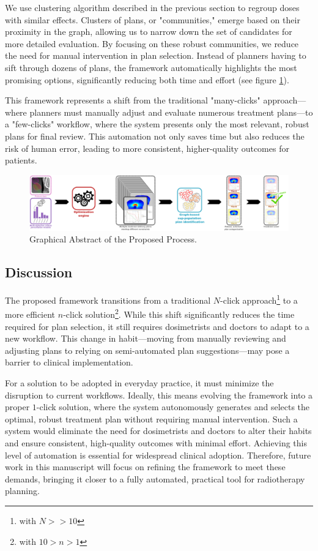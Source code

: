 We use clustering algorithm described in the previous section to regroup doses with similar effects.
Clusters of plans, or "communities," emerge based on their proximity in the graph, allowing us to narrow down the set of candidates for more detailed evaluation.
By focusing on these robust communities, we reduce the need for manual intervention in plan selection.
Instead of planners having to sift through dozens of plans, the framework automatically highlights the most promising options, significantly reducing both time and effort (see figure \ref{fig:graphical_abstract}).

This framework represents a shift from the traditional "many-clicks" approach—where planners must manually adjust and evaluate numerous treatment plans—to a "few-clicks" workflow, where the system presents only the most relevant, robust plans for final review.
This automation not only saves time but also reduces the risk of human error, leading to more consistent, higher-quality outcomes for patients.

\begin{figure}
	\centering
	\includegraphics[width=\textwidth]{dose_clustering_figures/graphical_abstract.pdf}
	\caption{Graphical Abstract of the Proposed Process.}
	\label{fig:graphical_abstract}
\end{figure}

\subsection{Discussion}
The proposed framework transitions from a traditional $N$-click approach\footnote{with $N >> 10$} to a more efficient $n$-click solution\footnote{with $10 > n > 1$}.
While this shift significantly reduces the time required for plan selection, it still requires dosimetrists and doctors to adapt to a new workflow.
This change in habit—moving from manually reviewing and adjusting plans to relying on semi-automated plan suggestions—may pose a barrier to clinical implementation.

For a solution to be adopted in everyday practice, it must minimize the disruption to current workflows.
Ideally, this means evolving the framework into a proper $1$-click solution, where the system autonomously generates and selects the optimal, robust treatment plan without requiring manual intervention.
Such a system would eliminate the need for dosimetrists and doctors to alter their habits and ensure consistent, high-quality outcomes with minimal effort.
Achieving this level of automation is essential for widespread clinical adoption.
Therefore, future work in this manuscript will focus on refining the framework to meet these demands, bringing it closer to a fully automated, practical tool for radiotherapy planning.

